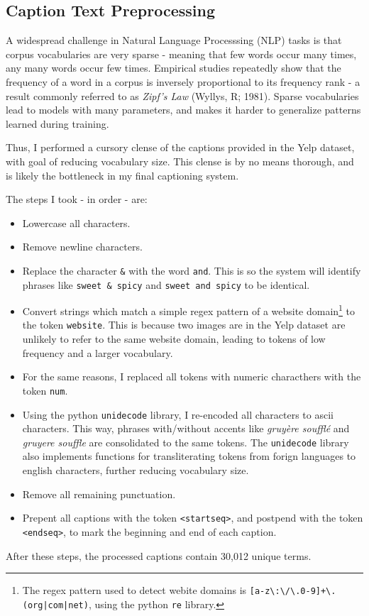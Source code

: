 \documentclass[letterpaper, 10 pt, conference]{ieeeconf}
\newcommand{\code}[1]{\colorbox{light-gray}{\texttt{#1}}}
\begin{document}
\subsection{Caption Text Preprocessing}

A widespread challenge in Natural Language Processsing (NLP) tasks is that corpus vocabularies are very sparse - meaning that few words occur many times, any many words occur few times. Empirical studies repeatedly show that the frequency of a word in a corpus is inversely proportional to its frequency rank -  a result commonly referred to as \emph{Zipf's Law} (Wyllys, R; 1981). Sparse vocabularies lead to models with many parameters, and makes it harder to generalize patterns learned during training. 

Thus, I performed a cursory clense of the captions provided in the Yelp dataset, with goal of reducing vocabulary size. This clense is by no means thorough, and is likely the bottleneck in my final captioning system. 

The steps I took - in order - are:
\begin{itemize}
\item Lowercase all characters.
\item Remove newline characters.
\item Replace the character \texttt{\&} with the word \texttt{and}. This is so the system will identify phrases like \texttt{sweet \& spicy} and \texttt{sweet and spicy} to be identical.
\item Convert strings which match a simple regex pattern of a website domain\footnote{The regex pattern used to detect webite domains is \texttt{[a-z\textbackslash:\textbackslash/\textbackslash.0-9]+\textbackslash.(org|com|net)}, using the python \texttt{re} library.} to the token \texttt{website}. This is because two images are in the Yelp dataset are unlikely to refer to the same website domain, leading to tokens of low frequency and a larger vocabulary.
\item For the same reasons, I replaced all tokens with numeric characthers with the token \texttt{num}.
\item Using the python \code{unidecode} library, I re-encoded all characters to ascii characters. This way, phrases with/without accents like \textit{gruyère soufflé} and \textit{gruyere souffle} are consolidated to the same tokens. The \code{unidecode} library also implements functions for transliterating tokens from forign languages to english characters, further reducing vocabulary size.
\item Remove all remaining punctuation.
\item Prepent all captions with the token \texttt{<startseq>}, and postpend with the token \texttt{<endseq>}, to mark the beginning and end of each caption.
\end{itemize}
After these steps, the processed captions contain 30,012 unique terms. 
\end{document}
